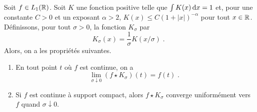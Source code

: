 \begin{lemma}\label{lem:regularisation}
  Soit $f\in L_1(\mathbb{R})$.
  Soit $K$ une fonction positive telle que $\int K(x)\,\mathrm{d} x=1$ et, pour une
  constante $C>0$ et un exposant $\alpha>2$, $K(x)\leq C (1+|x|)^{-\alpha}$
  pour tout $x\in\mathbb{R}$.  D{\'e}finissons, pour tout $\sigma>0$, la fonction
  $K_\sigma$ par
\begin{equation}
  \label{eq:Kband}
  K_\sigma(x)=\frac1\sigma K(x/\sigma)\;.
\end{equation}
Alors, on a les propri{\'e}t{\'e}s suivantes.
\begin{enumerate}[label=(\roman*)]
\item\label{item:regularisation1} En tout point $t$ o{\`u} $f$ est continue, on a
$$
\lim_{\sigma\downarrow0} (f \star K_\sigma)(t) = f(t)\;.
$$
\item\label{item:regularisation2} Si $f$ est continue {\`a} support compact, alors
  $f \star K_\sigma$ converge uniform{\'e}ment vers $f$ quand $\sigma\downarrow0$.
\end{enumerate}
\end{lemma}
